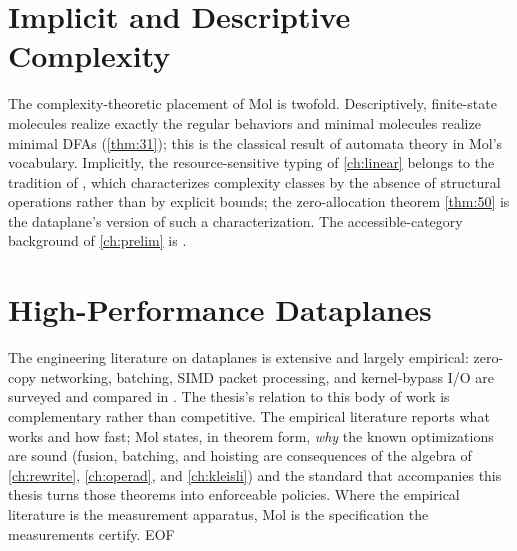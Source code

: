 \section{Implicit and Descriptive Complexity}
The complexity-theoretic placement of Mol is twofold. Descriptively, finite-state molecules realize exactly the regular behaviors and minimal molecules realize minimal DFAs (\ref{thm:31}); this is the classical result of automata theory in Mol's vocabulary. Implicitly, the resource-sensitive typing of \autoref{ch:linear} belongs to the tradition of \cite{arxiv-implicit-complexity}, which characterizes complexity classes by the absence of structural operations rather than by explicit bounds; the zero-allocation theorem \ref{thm:50} is the dataplane's version of such a characterization. The accessible-category background of \autoref{ch:prelim} is \cite{adamek}.

\section{High-Performance Dataplanes}
The engineering literature on dataplanes is extensive and largely empirical: zero-copy networking, batching, SIMD packet processing, and kernel-bypass I/O are surveyed and compared in \cite{arxiv-dataplane}. The thesis's relation to this body of work is complementary rather than competitive. The empirical literature reports what works and how fast; Mol states, in theorem form, \emph{why} the known optimizations are sound (fusion, batching, and hoisting are consequences of the algebra of \autoref{ch:rewrite}, \autoref{ch:operad}, and \autoref{ch:kleisli}) and the standard that accompanies this thesis turns those theorems into enforceable policies. Where the empirical literature is the measurement apparatus, Mol is the specification the measurements certify.
EOF